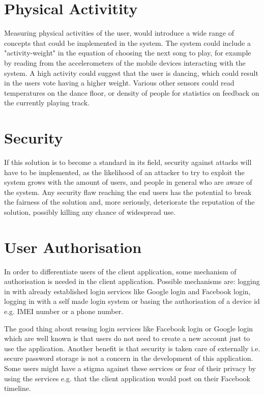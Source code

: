 \section{Physical Activitity}
Measuring physical activities of the user, would introduce a wide
range of concepts that could be implemented in the system. The system
could include a "activity-weight" in the equation of choosing the next
song to play, for example by reading from the accelerometers of the
mobile devices interacting with the system. A high activity could
suggest that the user is dancing, which could result in the users vote
having a higher weight. Various other sensors could read temperatures
on the dance floor, or density of people for statistics on feedback
on the currently playing track.

\section{Security}
If this solution is to become a standard in its field, security against attacks will have to be implemented, as the likelihood of an attacker to try to exploit the system grows with the amount of users, and people in general who are aware of the system. Any security flaw reaching the end users has the potential to break the fairness of the solution and, more seriously, deteriorate the reputation of the solution, possibly killing any chance of widespread use.

\section{User Authorisation}\label{sec:UAuth}
In order to differentiate users of the client application, some mechanism of authorisation is needed in the client application. Possible mechanisms are: logging in with already established login services like Google login and Facebook login, logging in with a self made login system or basing the authorisation of a device id e.g. IMEI number or a phone number.

The good thing about reusing login services like Facebook login or Google login which are well known is that users do not need to create a new account just to use the application. Another benefit is that security is taken care of externally i.e. secure password storage is not a concern in the development of this application. Some users might have a stigma against these services or fear of their privacy by using the services e.g. that the client application would post on their Facebook timeline.

